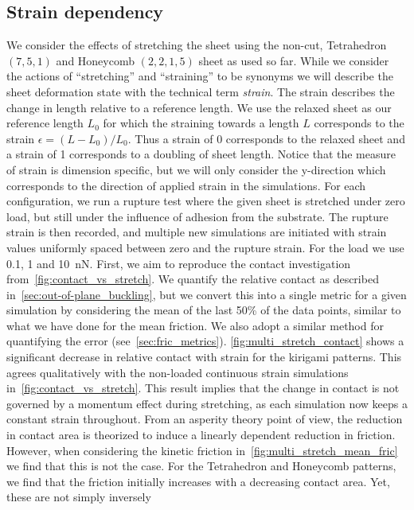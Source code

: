 \subsection{Strain dependency}\label{sec:stretch_dependency}
We consider the effects of stretching the sheet using the non-cut, Tetrahedron
$(7,5,1)$ and Honeycomb $(2,2,1,5)$ sheet as used so far. While we consider the
actions of ``stretching'' and ``straining'' to be synonyms we will describe the
sheet deformation state with the technical term \textit{strain}. The strain
describes the change in length relative to a reference length. We use the
relaxed sheet as our reference length $L_0$ for which the straining towards a
length $L$ corresponds to the strain $\epsilon = (L-L_0)/L_0$. Thus a strain of
0 corresponds to the relaxed sheet and a strain of 1 corresponds to a doubling
of sheet length. Notice that the measure of strain is dimension specific, but we will only consider the y-direction which corresponds to the direction of applied strain in the simulations. For each configuration, we run a rupture
test where the given sheet is stretched under zero load, but still under the
influence of adhesion from the substrate. The rupture strain is then recorded,
and multiple new simulations are initiated with strain values uniformly spaced between zero and the rupture strain. For the load we use 0.1, 1 and \SI{10}{nN}. First, we aim to reproduce
the contact investigation from~\cref{fig:contact_vs_stretch}. We quantify the
relative contact as described in~\cref{sec:out-of-plane_buckling}, but we
convert this into a single metric for a given simulation by considering the
mean of the last 50\% of the data points, similar to what we have done for
the mean friction. We also adopt a similar method for quantifying the error
(see~\cref{sec:fric_metrics}). \cref{fig:multi_stretch_contact} shows a significant decrease in
relative contact with strain for the kirigami patterns. This agrees
qualitatively with the non-loaded continuous strain simulations
in~\cref{fig:contact_vs_stretch}. This result implies that the change in contact
is not governed by a momentum effect during stretching, as each simulation now
keeps a constant strain throughout. From an asperity theory point of view, the
reduction in contact area is theorized to induce a linearly dependent reduction in
friction. However, when considering the kinetic friction
in~\cref{fig:multi_stretch_mean_fric} we find that this is not the case. For the
Tetrahedron and Honeycomb patterns, we find that the friction initially
increases with a decreasing contact area. Yet, these are not simply inversely
